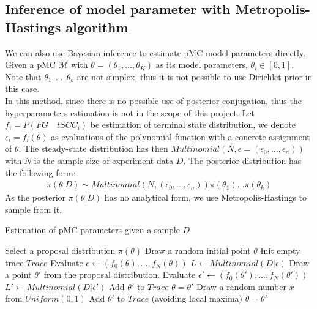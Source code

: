\documentclass[12pt]{article}
\theoremstyle{definition}
\begin{document}
\subsection{Inference of model parameter with Metropolis-Hastings algorithm}
We can also use Bayesian inference to estimate pMC model parameters directly.
Given a pMC $\mathcal{M}$ with $\theta=(\theta_1,\ldots,\theta_{K})$ as its model
parameters, $\theta_i \in [0,1]$. Note that $\theta_1,\ldots,\theta_k$ are not
simplex, thus it is not possible to use Dirichlet prior in this case. \\
In this method, since there is no possible use of posterior conjugation, thus
the hyperparameters estimation is not in the scope of this project. Let
$f_i = P (FG\quad tSCC_i)$ be estimation of terminal state
distribution, we denote $\epsilon_i = f_i(\theta)$ as evaluations of the
polynomial function with a concrete assignment of $\theta$. The steady-state
distribution has then $Multinomial(N, \epsilon =
(\epsilon_0,\ldots,\epsilon_n))$ with $N$ is the sample size of experiment data
$D$. The posterior distribution has the following form:
\begin{align*}
  \pi(\theta|D) \sim Multinomial(N, (\epsilon_0,\ldots,\epsilon_n))\pi(\theta_1)\ldots\pi(\theta_k)
\end{align*}
As the posterior $\pi(\theta|D)$ has no analytical form, we use
Metropolis-Hastings to sample from it.
\begin{algorithm}[H]
  \caption{Estimation of pMC parameters given a sample $D$}\label{exp_b}
  \begin{algorithmic}[1]
    \State Select a proposal distribution $\pi(\theta)$
    \State Draw a random initial point $\theta$
    \State Init empty trace $Trace$
    \State Evaluate $\epsilon \leftarrow (f_0(\theta),\ldots,f_N(\theta))$
    \State $L \leftarrow Multinomial(D|\epsilon)$
    \State Draw a point $\theta'$ from the proposal distribution.
    \State Evaluate $\epsilon' \leftarrow (f_0(\theta'),\ldots,f_N(\theta'))$
    \State $L' \leftarrow Multinomial(D|\epsilon')$
    \State Add $\theta'$ to $Trace$
    \State $\theta = \theta'$
    \Else
    \State Draw a random number $x$ from $Uniform(0,1)$
    \State Add $\theta'$ to $Trace$ (avoiding local maxima)
    \State $\theta = \theta'$
    \EndIf
    \EndIf
    \EndWhile
    \EndProcedure
  \end{algorithmic}
\end{algorithm}
\end{document}
